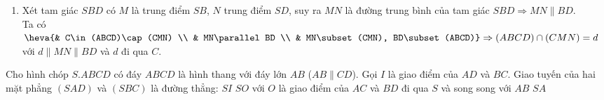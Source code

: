 \begin{bt}
{\begin{enumerate}
			Vậy $E$ là giao điểm của $SO$ và $(MNP)$.
			\item Xét tam giác $SBD$ có $M$ là trung điểm $SB$, $N$ trung điểm $SD$, suy ra $MN$ là đường trung bình của tam giác $SBD\Rightarrow MN\parallel BD$.\\
			Ta có $\heva{& C\in (ABCD)\cap (CMN) \\ & MN\parallel BD \\ & MN\subset (CMN), BD\subset (ABCD)}\Rightarrow (ABCD)\cap (CMN)=d$ với $d\parallel MN\parallel BD$ và $d$ đi qua $C$.
		\end{enumerate}
	}
\end{bt}

\begin{ex}%
	Cho hình chóp $S.ABCD$ có đáy $ABCD$ là hình thang với đáy lớn $AB$ ($AB \parallel CD$). Gọi $I$ là giao điểm của $AD$ và $BC$. Giao tuyến của hai mặt phẳng $(SAD)$ và $(SBC)$ là đường thẳng:
	\choice
	{\True $SI$}
	{$SO$ với $O$ là giao điểm của $AC$ và $BD$}
	{đi qua $S$ và song song với $AB$}
	{$SA$}
\end{ex}


